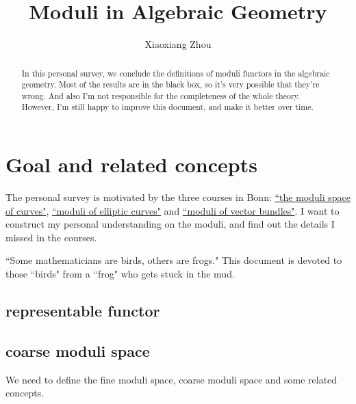 \documentclass[reqno,11pt]{amsart}
\numberwithin{equation}{section}
\theoremstyle{plain}
\theoremstyle{plain}
\numberwithin{equation}{section}
\theoremstyle{remark}
\begin{document}
\date{}

\title
{Moduli in Algebraic Geometry}


\author{Xiaoxiang Zhou}
\address{School of Mathematical Sciences\\
University of Bonn\\
Bonn, 53115\\ Germany\\} 





\begin{abstract}
In this personal survey, we conclude the definitions of moduli functors in the algebraic geometry. Most of the results are in the black box, so it's very possible that they're wrong. And also I'm not responsible for the completeness of the whole theory. However, I'm still happy to improve this document, and make it better over time.
\end{abstract}

\setcounter{tocdepth}{1}
\maketitle
\tableofcontents
\section{Goal and related concepts}
The personal survey is motivated by the three courses in Bonn: \href{https://johannesschmitt.gitlab.io/moduli_of_curves}{``the moduli space of curves"}, \href{https://www.math.uni-bonn.de/people/mihatsch/21u22\%20WS/moduli/}{``moduli of elliptic curves"} and \href{https://www.math.uni-bonn.de/people/ydutta/v5a4}{``moduli of vector bundles"}. I want to construct my personal understanding on the moduli, and find out the details I missed in the courses. 

``Some mathematicians are birds, others
are frogs." This document is devoted to those ``birds" from a ``frog" who gets stuck in the mud. 
\subsection{representable functor}
\subsection{coarse moduli space}
We need to define the fine moduli space, coarse moduli space and some related concepts.
\end{document}

